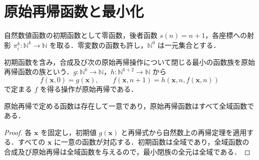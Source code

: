 \section{原始再帰函数と最小化}
\begin{defn}[原始再帰函数の初期函数]
自然数値函数の初期函数として零函数，後者函数 $s(n)=n+1$，各座標への射影 $\pi_i^k:\mathbb N^k\to\mathbb N$ を取る．零変数の函数も許し，$\mathbb N^0$ は一元集合とする．
\end{defn}
\begin{defn}[原始再帰函数]
初期函数を含み，合成及び次の原始再帰操作について閉じる最小の函数族を原始再帰函数の族という．$g:\mathbb N^k\to\mathbb N$，$h:\mathbb N^{k+2}\to\mathbb N$ から
\[
 f(\mathbf x,0)=g(\mathbf x),\qquad f(\mathbf x,n+1)=h(\mathbf x,n,f(\mathbf x,n))
\]
で定まる $f$ を得る操作が原始再帰である．
\end{defn}
\begin{prop}[原始再帰函数の全域性]
原始再帰で定める函数は存在して一意であり，原始再帰函数はすべて全域函数である．
\end{prop}
\begin{proof}
各 $\mathbf x$ を固定し，初期値 $g(\mathbf x)$ と再帰式から自然数上の再帰定理を適用する．すべての $\mathbf x$ に一意の函数が対応する．初期函数は全域であり，全域函数の合成及び原始再帰は全域函数を与えるので，最小閉族の全元は全域である．
\end{proof}
